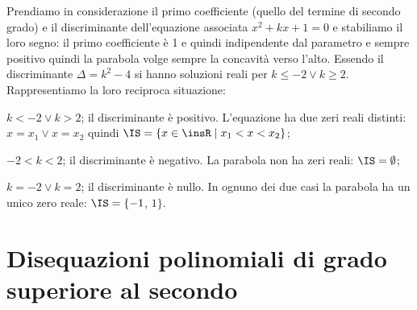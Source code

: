 \begin{exrig}
\begin{esempio}
Prendiamo in considerazione il primo coefficiente (quello del termine di secondo grado) e il discriminante dell'equazione associata $x^2+kx+1=0$ e stabiliamo il loro segno: il primo coefficiente è 1 e quindi indipendente dal parametro e sempre positivo quindi la parabola volge sempre la concavità verso l'alto. Essendo il discriminante $\Delta =k^2-4$ si hanno soluzioni reali per $k\le -2\vee k\ge 2$. Rappresentiamo la loro reciproca situazione:
\begin{center}
 
\end{center}
\begin{itemize*}
\item $k<-2\vee k>2$; il discriminante è positivo. L'equazione ha due zeri reali distinti: $x=x_1\vee x=x_2$ quindi $\IS=\{x \in \insR \mid x_1<x<x_2\}$;
\item $-2<k<2$; il discriminante è negativo. La parabola non ha zeri reali: $\IS=\emptyset$;
\item $k=-2\vee k=2$; il discriminante è nullo. In ognuno dei due casi la parabola ha un unico zero reale: $\IS=\{-1$, $1\}$.
\end{itemize*}
\end{esempio}
\end{exrig}

\vspazio\ovalbox{\risolvii \ref{ese:4.24}, \ref{ese:4.25}, \ref{ese:4.26}}

\section{Disequazioni polinomiali di grado superiore al secondo}

